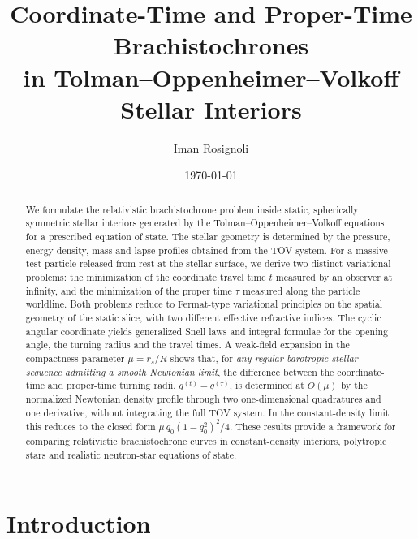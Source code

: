 \documentclass[
  aps,
  prd,
  twocolumn,
  nofootinbib,
  superscriptaddress,
  longbibliography
]{revtex4-2}
\begin{document}
\title{Coordinate-Time and Proper-Time Brachistochrones\\
in Tolman--Oppenheimer--Volkoff Stellar Interiors}

\author{Iman Rosignoli}

\date{\today}

\begin{abstract}
We formulate the relativistic brachistochrone problem inside static,
spherically symmetric stellar interiors generated by the
Tolman--Oppenheimer--Volkoff equations for a prescribed equation of
state. The stellar geometry is determined by the pressure,
energy-density, mass and lapse profiles obtained from the TOV system.
For a massive test particle released from rest at the stellar surface,
we derive two distinct variational problems: the minimization of the
coordinate travel time $t$ measured by an observer at infinity, and the
minimization of the proper time $\tau$ measured along the particle
worldline. Both problems reduce to Fermat-type variational principles
on the spatial geometry of the static slice, with two different
effective refractive indices. The cyclic angular coordinate yields generalized Snell laws and
integral formulae for the opening angle, the turning radius and the
travel times. A weak-field expansion in the compactness
parameter $\mu=r_s/R$ shows that, for \emph{any regular barotropic
stellar sequence admitting a smooth Newtonian limit}, the difference
between the coordinate-time and proper-time turning radii,
$q^{(t)}-q^{(\tau)}$, is determined at $O(\mu)$ by the normalized
Newtonian density profile through two one-dimensional quadratures and
one derivative, without integrating the full TOV system. In the
constant-density limit this reduces to the closed form
$\mu\,q_0(1-q_0^2)^2/4$. These results provide a framework for
comparing relativistic brachistochrone curves in constant-density
interiors, polytropic stars and realistic neutron-star equations of
state.
\end{abstract}

\maketitle

\section{Introduction}
\end{document}
